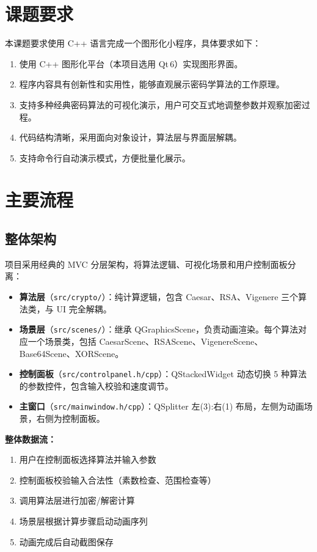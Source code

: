 \documentclass[a4paper,UTF8]{ctexart}
\begin{document}
\section{课题要求}

本课题要求使用 C++ 语言完成一个图形化小程序，具体要求如下：

\begin{enumerate}[label=(\arabic*)]
  \item 使用 C++ 图形化平台（本项目选用 Qt\,6）实现图形界面。
  \item 程序内容具有创新性和实用性，能够直观展示密码学算法的工作原理。
  \item 支持多种经典密码算法的可视化演示，用户可交互式地调整参数并观察加密过程。
  \item 代码结构清晰，采用面向对象设计，算法层与界面层解耦。
  \item 支持命令行自动演示模式，方便批量化展示。
\end{enumerate}

\section{主要流程}

\subsection{整体架构}

项目采用经典的 MVC 分层架构，将算法逻辑、可视化场景和用户控制面板分离：

\begin{itemize}
  \item \textbf{算法层}（\texttt{src/crypto/}）：纯计算逻辑，包含 Caesar、RSA、Vigenere 三个算法类，与 UI 完全解耦。
  \item \textbf{场景层}（\texttt{src/scenes/}）：继承 QGraphicsScene，负责动画渲染。每个算法对应一个场景类，包括 CaesarScene、RSAScene、VigenereScene、Base64Scene、XORScene。
  \item \textbf{控制面板}（\texttt{src/controlpanel.h/cpp}）：QStackedWidget 动态切换 5 种算法的参数控件，包含输入校验和速度调节。
  \item \textbf{主窗口}（\texttt{src/mainwindow.h/cpp}）：QSplitter 左(3):右(1) 布局，左侧为动画场景，右侧为控制面板。
\end{itemize}

\textbf{整体数据流：}
\begin{enumerate}
  \item 用户在控制面板选择算法并输入参数
  \item 控制面板校验输入合法性（素数检查、范围检查等）
  \item 调用算法层进行加密/解密计算
  \item 场景层根据计算步骤启动动画序列
  \item 动画完成后自动截图保存
\end{enumerate}
\end{document}
